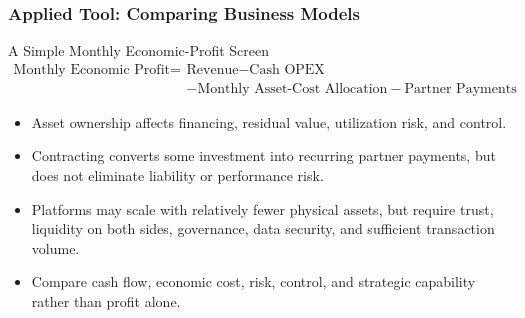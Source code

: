 \documentclass{beamer}
\begin{document}
\begin{frame}[t]
\frametitle{Applied Tool: Comparing Business Models}
\begin{block}{A Simple Monthly Economic-Profit Screen}
\[
\begin{split}
\text{Monthly Economic Profit}={}&\text{Revenue}-\text{Cash OPEX}\\
&-\text{Monthly Asset-Cost Allocation}-\text{Partner Payments}
\end{split}
\]
\end{block}
\begin{itemize}
\item Asset ownership affects financing, residual value, utilization risk, and control.
\item Contracting converts some investment into recurring partner payments, but does not eliminate liability or performance risk.
\item Platforms may scale with relatively fewer physical assets, but require trust, liquidity on both sides, governance, data security, and sufficient transaction volume.
\item Compare cash flow, economic cost, risk, control, and strategic capability rather than profit alone.
\end{itemize}
\end{frame}
\end{document}
